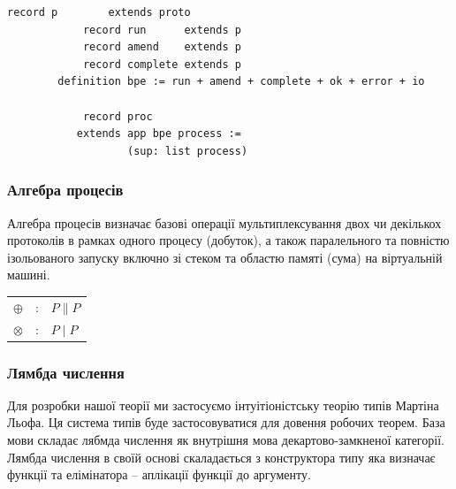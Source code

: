 \documentclass[11pt,oneside]{article}
\begin{document}
\begin{center}
\begin{lstlisting}[mathescape=true]
            record p        extends proto
            record run      extends p
            record amend    extends p
            record complete extends p
        definition bpe := run + amend + complete + ok + error + io

            record proc
           extends app bpe process :=
                   (sup: list process)

\end{lstlisting}
\end{center}

  \subsubsection{Алгебра процесів}

  Алгебра процесів визначає базові операції мультиплексування двох чи декількох
  протоколів в рамках одного процесу (добуток), а також паралельного та повністю
  ізольованого запуску включно зі стеком та областю памяті (сума) на
  віртуальній машині.

\begin{center}
\begin{tabular}{lcl}
$\oplus$   &:& $P \parallel P$\\
$\otimes$  &:& $P \mid P$\\
\end{tabular}
\end{center}


\newpage
  \subsubsection{Лямбда числення}

Для розробки нашої теорії ми застосуємо інтуітіоністську теорію типів Мартіна Льофа.
Ця система типів буде застосовуватися для довення робочих теорем. База мови складає
лябмда числення як внутрішня мова декартово-замкненої категорії. Лямбда числення в своїй
основі скаладається з конструктора типу яка визначає функції та елімінатора -- аплікації
функції до аргументу.

\begingroup
\parbox[t][][l]{0.40\textwidth}{

\begin{prooftree}
\end{prooftree}

}
\hspace{0.1cm}
\parbox[t][][r]{0.60\textwidth}{

\begin{prooftree}
\end{prooftree}

}
\endgroup
\end{document}

